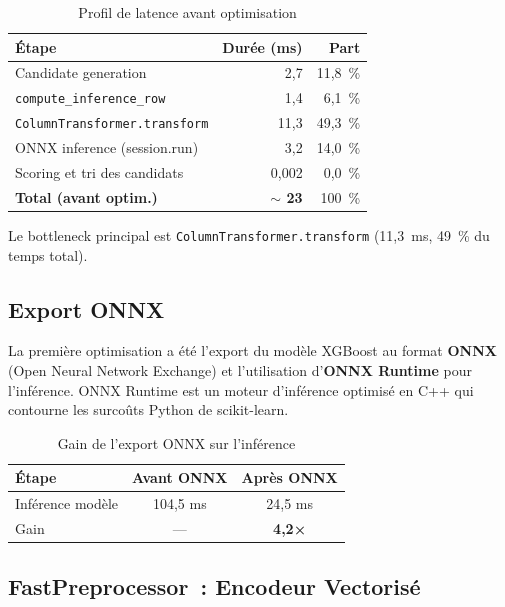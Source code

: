 \documentclass[12pt, a4paper]{report}
\begin{document}
\begin{table}[H]
\centering
\caption{Profil de latence avant optimisation}
\label{tab:latence-pre}
\begin{tabular}{|l|r|r|}
\hline
\textbf{Étape} & \textbf{Durée (ms)} & \textbf{Part} \\
\hline
Candidate generation & 2{,}7 & 11{,}8~\% \\
\hline
\texttt{compute\_inference\_row} & 1{,}4 & 6{,}1~\% \\
\hline
\texttt{ColumnTransformer.transform} & 11{,}3 & 49{,}3~\% \\
\hline
ONNX inference (session.run) & 3{,}2 & 14{,}0~\% \\
\hline
Scoring et tri des candidats & 0{,}002 & 0{,}0~\% \\
\hline
\textbf{Total (avant optim.)} & \textbf{$\sim$ 23} & 100~\% \\
\hline
\end{tabular}
\end{table}

Le bottleneck principal est \texttt{ColumnTransformer.transform} (11{,}3~ms,
49~\% du temps total).

\subsection{Export ONNX}

La première optimisation a été l'export du modèle XGBoost au format
\textbf{ONNX} (Open Neural Network Exchange) et l'utilisation d'\textbf{ONNX
Runtime} pour l'inférence. ONNX Runtime est un moteur d'inférence optimisé
en C++ qui contourne les surcoûts Python de scikit-learn.

\begin{table}[H]
\centering
\caption{Gain de l'export ONNX sur l'inférence}
\label{tab:onnx-gain}
\begin{tabular}{|l|c|c|}
\hline
\textbf{Étape} & \textbf{Avant ONNX} & \textbf{Après ONNX} \\
\hline
Inférence modèle & 104{,}5 ms & 24{,}5 ms \\
\hline
Gain & --- & \textbf{4{,}2×} \\
\hline
\end{tabular}
\end{table}

\subsection{FastPreprocessor~: Encodeur Vectorisé}
\end{document}
